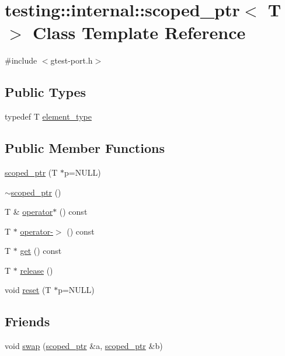 \hypertarget{classtesting_1_1internal_1_1scoped__ptr}{}\section{testing\+:\+:internal\+:\+:scoped\+\_\+ptr$<$ T $>$ Class Template Reference}
\label{classtesting_1_1internal_1_1scoped__ptr}


{\ttfamily \#include $<$gtest-\/port.\+h$>$}

\subsection*{Public Types}
\begin{DoxyCompactItemize}
\item 
typedef T \hyperlink{classtesting_1_1internal_1_1scoped__ptr_ae755ffeebada8e20b68c1d1ffa91cf13}{element\+\_\+type}
\end{DoxyCompactItemize}
\subsection*{Public Member Functions}
\begin{DoxyCompactItemize}
\item 
\hyperlink{classtesting_1_1internal_1_1scoped__ptr_adb972432999a0c63720df148964ac2a5}{scoped\+\_\+ptr} (T $\ast$p=N\+U\+LL)
\item 
\hyperlink{classtesting_1_1internal_1_1scoped__ptr_ab721de9bf4369f002fb563e82352ee36}{$\sim$scoped\+\_\+ptr} ()
\item 
T \& \hyperlink{classtesting_1_1internal_1_1scoped__ptr_a0aba95f68eceb6422a0b50b6f92047c2}{operator$\ast$} () const
\item 
T $\ast$ \hyperlink{classtesting_1_1internal_1_1scoped__ptr_a2b465830a322e2c3ea420e5ccf0472f4}{operator-\/$>$} () const
\item 
T $\ast$ \hyperlink{classtesting_1_1internal_1_1scoped__ptr_aa5984291e12453f1e81b7676d1fa26fd}{get} () const
\item 
T $\ast$ \hyperlink{classtesting_1_1internal_1_1scoped__ptr_a7a4f3e568d81a5d8bcb5f8d6bf5130b1}{release} ()
\item 
void \hyperlink{classtesting_1_1internal_1_1scoped__ptr_acac03266a43359801aff0de5c990bec0}{reset} (T $\ast$p=N\+U\+LL)
\end{DoxyCompactItemize}
\subsection*{Friends}
\begin{DoxyCompactItemize}
\item 
void \hyperlink{classtesting_1_1internal_1_1scoped__ptr_a01bc0441e6a3ebf26807ac523392ca86}{swap} (\hyperlink{classtesting_1_1internal_1_1scoped__ptr}{scoped\+\_\+ptr} \&a, \hyperlink{classtesting_1_1internal_1_1scoped__ptr}{scoped\+\_\+ptr} \&b)
\end{DoxyCompactItemize}


